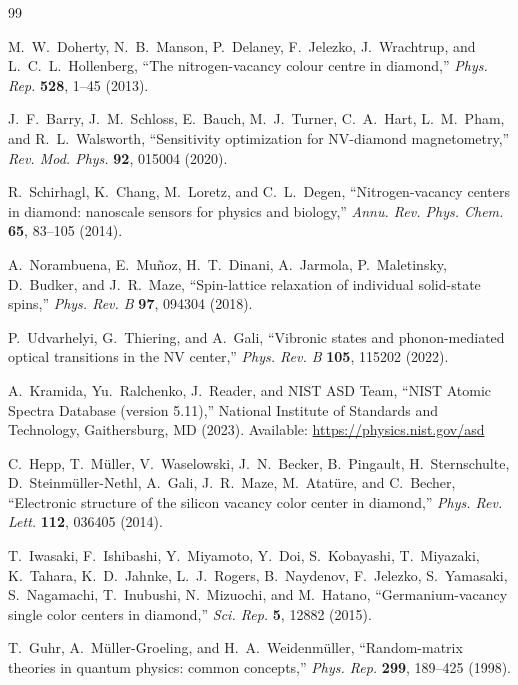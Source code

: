 \documentclass[11pt,a4paper]{article}
\begin{document}
\begin{thebibliography}{99}

M.~W.~Doherty, N.~B.~Manson, P.~Delaney, F.~Jelezko, J.~Wrachtrup, and L.~C.~L.~Hollenberg,
``The nitrogen-vacancy colour centre in diamond,''
\textit{Phys. Rep.} \textbf{528}, 1--45 (2013).

J.~F.~Barry, J.~M.~Schloss, E.~Bauch, M.~J.~Turner, C.~A.~Hart, L.~M.~Pham, and R.~L.~Walsworth,
``Sensitivity optimization for NV-diamond magnetometry,''
\textit{Rev. Mod. Phys.} \textbf{92}, 015004 (2020).

R.~Schirhagl, K.~Chang, M.~Loretz, and C.~L.~Degen,
``Nitrogen-vacancy centers in diamond: nanoscale sensors for physics and biology,''
\textit{Annu. Rev. Phys. Chem.} \textbf{65}, 83--105 (2014).

A.~Norambuena, E.~Muñoz, H.~T.~Dinani, A.~Jarmola, P.~Maletinsky, D.~Budker, and J.~R.~Maze,
``Spin-lattice relaxation of individual solid-state spins,''
\textit{Phys. Rev. B} \textbf{97}, 094304 (2018).

P.~Udvarhelyi, G.~Thiering, and A.~Gali,
``Vibronic states and phonon-mediated optical transitions in the NV center,''
\textit{Phys. Rev. B} \textbf{105}, 115202 (2022).

A.~Kramida, Yu.~Ralchenko, J.~Reader, and NIST ASD Team,
``NIST Atomic Spectra Database (version 5.11),''
National Institute of Standards and Technology, Gaithersburg, MD (2023).
Available: \url{https://physics.nist.gov/asd}

C.~Hepp, T.~Müller, V.~Waselowski, J.~N.~Becker, B.~Pingault, H.~Sternschulte, D.~Steinmüller-Nethl, A.~Gali, J.~R.~Maze, M.~Atatüre, and C.~Becher,
``Electronic structure of the silicon vacancy color center in diamond,''
\textit{Phys. Rev. Lett.} \textbf{112}, 036405 (2014).

T.~Iwasaki, F.~Ishibashi, Y.~Miyamoto, Y.~Doi, S.~Kobayashi, T.~Miyazaki, K.~Tahara, K.~D.~Jahnke, L.~J.~Rogers, B.~Naydenov, F.~Jelezko, S.~Yamasaki, S.~Nagamachi, T.~Inubushi, N.~Mizuochi, and M.~Hatano,
``Germanium-vacancy single color centers in diamond,''
\textit{Sci. Rep.} \textbf{5}, 12882 (2015).

T.~Guhr, A.~Müller-Groeling, and H.~A.~Weidenmüller,
``Random-matrix theories in quantum physics: common concepts,''
\textit{Phys. Rep.} \textbf{299}, 189--425 (1998).


\end{thebibliography}
\end{document}
